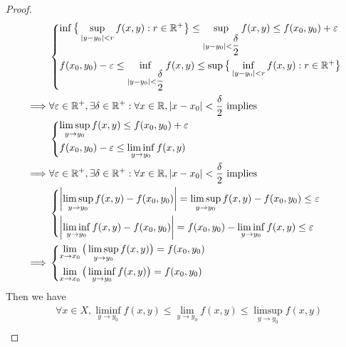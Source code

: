 \begin{proof}
\begin{align*}
             & \begin{dcases}
                 \inf\big\{\sup_{\left\lvert y - y_0\right\rvert < r} f(x, y) : r \in \mathbb{R}^+\big\} \leq \sup_{\left\lvert y - y_0\right\rvert < \dfrac{\delta}{2}} f(x, y) \leq f(x_0, y_0) + \varepsilon \\
                 f(x_0, y_0) - \varepsilon \leq \inf_{\left\lvert y - y_0\right\rvert < \dfrac{\delta}{2}} f(x, y) \leq \sup\big\{\inf_{\left\lvert y - y_0\right\rvert < r} f(x, y) : r \in \mathbb{R}^+\big\}
               \end{dcases} \\
    \implies & \forall \varepsilon \in \mathbb{R}^+, \exists \delta \in \mathbb{R}^+ : \forall x \in \mathbb{R}, \left\lvert x - x_0\right\rvert < \dfrac{\delta}{2} \text{ implies}                                                  \\
             & \begin{dcases}
                 \limsup_{y \to y_0} f(x, y) \leq f(x_0, y_0) + \varepsilon \\
                 f(x_0, y_0) - \varepsilon \leq \liminf_{y \to y_0} f(x, y)
               \end{dcases}                                                                                                                   \\
    \implies & \forall \varepsilon \in \mathbb{R}^+, \exists \delta \in \mathbb{R}^+ : \forall x \in \mathbb{R}, \left\lvert x - x_0\right\rvert < \dfrac{\delta}{2} \text{ implies}                                                  \\
             & \begin{dcases}
                 \left\lvert\limsup_{y \to y_0} f(x, y) - f(x_0, y_0)\right\rvert = \limsup_{y \to y_0} f(x, y) - f(x_0, y_0) \leq \varepsilon \\
                 \left\lvert\liminf_{y \to y_0} f(x, y) - f(x_0, y_0)\right\rvert = f(x_0, y_0) - \liminf_{y \to y_0} f(x, y) \leq \varepsilon
               \end{dcases}                                                             \\
    \implies & \begin{dcases}
                 \lim_{x \to x_0} \big(\limsup_{y \to y_0} f(x, y)\big) = f(x_0, y_0) \\
                 \lim_{x \to x_0} \big(\liminf_{y \to y_0} f(x, y)\big) = f(x_0, y_0)
               \end{dcases}
  \end{align*}
  Then we have
  \begin{align*}
             & \forall x \in X, \liminf_{y \to y_0} f(x, y) \leq \lim_{y \to y_0} f(x, y) \leq \limsup_{y \to y_0} f(x, y)                              \\

\end{align*}
\end{proof}
